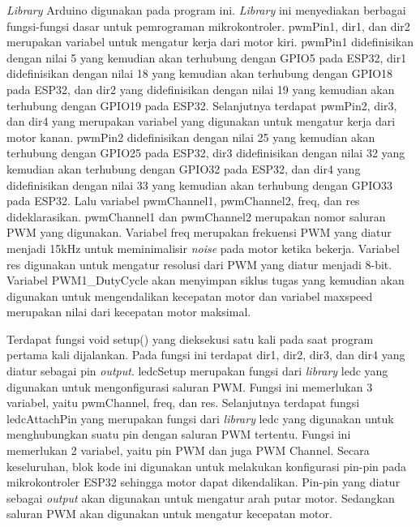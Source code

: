 \emph{Library} Arduino digunakan pada program ini. \emph{Library} ini menyediakan berbagai fungsi-fungsi dasar untuk pemrograman mikrokontroler. pwmPin1, dir1, dan dir2 merupakan variabel untuk mengatur kerja dari motor kiri. pwmPin1 didefinisikan dengan nilai 5 yang kemudian akan terhubung dengan GPIO5 pada ESP32, dir1 didefinisikan dengan nilai 18 yang kemudian akan terhubung dengan GPIO18 pada ESP32, dan dir2 yang didefinisikan dengan nilai 19 yang kemudian akan terhubung dengan GPIO19 pada ESP32. Selanjutnya terdapat pwmPin2, dir3, dan dir4 yang merupakan variabel yang digunakan untuk mengatur kerja dari motor kanan. pwmPin2 didefinisikan dengan nilai 25 yang kemudian akan terhubung dengan GPIO25 pada ESP32, dir3 didefinisikan dengan nilai 32 yang kemudian akan terhubung dengan GPIO32 pada ESP32, dan dir4 yang didefinisikan dengan nilai 33 yang kemudian akan terhubung dengan GPIO33 pada ESP32. Lalu variabel pwmChannel1, pwmChannel2, freq, dan res dideklarasikan. pwmChannel1 dan pwmChannel2 merupakan nomor saluran PWM yang digunakan. Variabel freq merupakan frekuensi PWM yang diatur menjadi 15kHz untuk meminimalisir \emph{noise} pada motor ketika bekerja. Variabel res digunakan untuk mengatur resolusi dari PWM yang diatur menjadi 8-bit. Variabel PWM1\_DutyCycle akan menyimpan siklus tugas yang kemudian akan digunakan untuk mengendalikan kecepatan motor dan variabel maxspeed merupakan nilai dari kecepatan motor maksimal.

Terdapat fungsi void setup() yang dieksekusi satu kali pada saat program pertama kali dijalankan. Pada fungsi ini terdapat dir1, dir2, dir3, dan dir4 yang diatur sebagai pin \emph{output}. ledcSetup merupakan fungsi dari \emph{library} ledc yang digunakan untuk mengonfigurasi saluran PWM. Fungsi ini memerlukan 3 variabel, yaitu pwmChannel, freq, dan res. Selanjutnya terdapat fungsi ledcAttachPin yang merupakan fungsi dari \emph{library} ledc yang digunakan untuk menghubungkan suatu pin dengan saluran PWM tertentu. Fungsi ini memerlukan 2 variabel, yaitu pin PWM dan juga PWM Channel. Secara keseluruhan, blok kode ini digunakan untuk melakukan konfigurasi pin-pin pada mikrokontroler ESP32 sehingga motor dapat dikendalikan. Pin-pin yang diatur sebagai \emph{output} akan digunakan untuk mengatur arah putar motor. Sedangkan saluran PWM akan digunakan untuk mengatur kecepatan motor.

